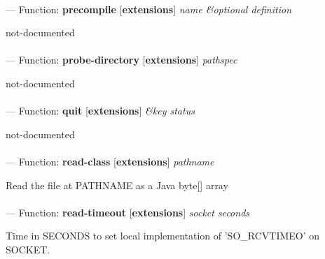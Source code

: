 \paragraph{}
\label{EXTENSIONS:PRECOMPILE}
--- Function: \textbf{precompile} [\textbf{extensions}] \textit{name \&optional definition}

\begin{adjustwidth}{5em}{5em}
not-documented
\end{adjustwidth}

\paragraph{}
\label{EXTENSIONS:PROBE-DIRECTORY}
--- Function: \textbf{probe-directory} [\textbf{extensions}] \textit{pathspec}

\begin{adjustwidth}{5em}{5em}
not-documented
\end{adjustwidth}

\paragraph{}
\label{EXTENSIONS:QUIT}
--- Function: \textbf{quit} [\textbf{extensions}] \textit{\&key status}

\begin{adjustwidth}{5em}{5em}
not-documented
\end{adjustwidth}

\paragraph{}
\label{EXTENSIONS:READ-CLASS}
--- Function: \textbf{read-class} [\textbf{extensions}] \textit{pathname}

\begin{adjustwidth}{5em}{5em}
Read the file at PATHNAME as a Java byte[] array
\end{adjustwidth}

\paragraph{}
\label{EXTENSIONS:READ-TIMEOUT}
--- Function: \textbf{read-timeout} [\textbf{extensions}] \textit{socket seconds}

\begin{adjustwidth}{5em}{5em}
Time in SECONDS to set local implementation of 'SO\_RCVTIMEO' on SOCKET.
\end{adjustwidth}

